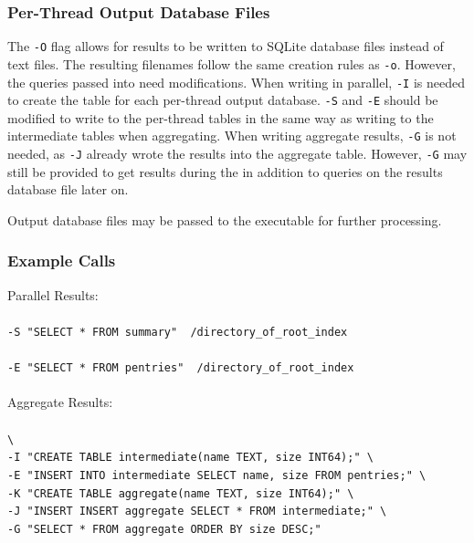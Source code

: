 \subsubsection{Per-Thread Output Database Files}
The \texttt{-O} flag allows for results to be written to SQLite
database files instead of text files. The resulting filenames follow
the same creation rules as \texttt{-o}. However, the queries passed
into \gufiquery need modifications. When writing in parallel,
\texttt{-I} is needed to create the table for each per-thread output
database. \texttt{-S} and \texttt{-E} should be modified to write to
the per-thread tables in the same way as writing to the intermediate
tables when aggregating. When writing aggregate results, \texttt{-G}
is not needed, as \texttt{-J} already wrote the results into the
aggregate table. However, \texttt{-G} may still be provided to get
results during the \gufiquery in addition to queries on the results
database file later on.

Output database files may be passed to the \querydbs executable for
further processing.

\subsubsection{Example Calls}

\noindent Parallel Results:
\\\\
\noindent \gufiquery \texttt{-S "SELECT * FROM summary"
  ~/directory\_of\_root\_index}
\\\\
\noindent \gufiquery \texttt{-E "SELECT * FROM pentries"
  ~/directory\_of\_root\_index}
\\\\
\noindent Aggregate Results:
\\\\
\noindent \gufiquery \texttt{\textbackslash} \\
\texttt{-I "CREATE TABLE intermediate(name TEXT, size INT64);" \textbackslash} \\
\texttt{-E "INSERT INTO intermediate SELECT name, size FROM pentries;" \textbackslash} \\
\texttt{-K "CREATE TABLE aggregate(name TEXT, size INT64);" \textbackslash} \\
\texttt{-J "INSERT INSERT aggregate SELECT * FROM intermediate;" \textbackslash} \\
\texttt{-G "SELECT * FROM aggregate ORDER BY size DESC;"} \\

